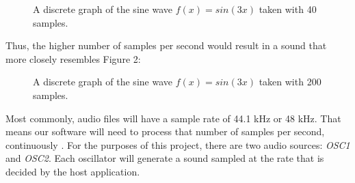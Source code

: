 \documentclass[12pt]{article}
\begin{document}
\begin{figure}[h] %
	\begin{center}
		\caption{A discrete graph of the sine wave \(f(x) = sin(3x)\) taken with 40 samples.}
	\end{center}
\end{figure}

Thus, the higher number of samples per second would result in a sound that more closely resembles Figure 2:

\begin{figure}[h] %
	\begin{center}
		\caption{A discrete graph of the sine wave \(f(x) = sin(3x)\) taken with 200 samples.}
	\end{center}
\end{figure}


Most commonly, audio files will have a sample rate of 44.1 kHz or 48 kHz. That means our software will need to process that number of samples per second, continuously \cite{Doumler}. For the purposes of this project, there are two audio sources: \textit{OSC1} and \textit{OSC2}. Each oscillator will generate a sound sampled at the rate that is decided by the host application.
\end{document}
